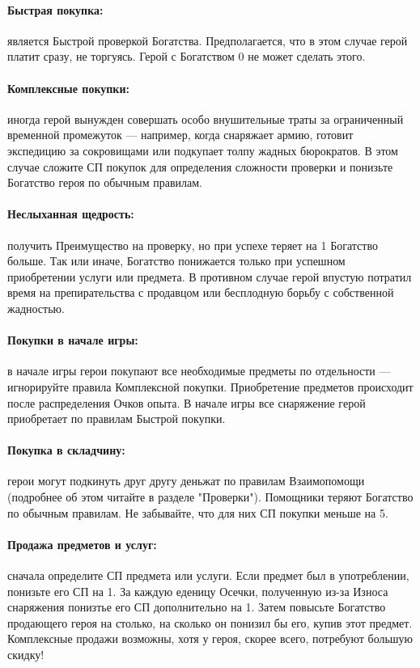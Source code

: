 \paragraph{Быстрая покупка:} является Быстрой проверкой Богатства. Предполагается, что в этом случае герой платит сразу, не торгуясь. Герой с Богатством 0 не может сделать этого.
\paragraph{Комплексные покупки:} иногда герой вынужден совершать особо внушительные траты за ограниченный временной промежуток — например, когда снаряжает армию, готовит экспедицию за сокровищами или подкупает толпу жадных бюрократов. В этом случае сложите СП покупок для определения сложности проверки и понизьте Богатство героя по обычным правилам.
\paragraph{Неслыханная щедрость:} получить Преимущество на проверку, но при успехе теряет на 1 Богатство больше. Так или иначе, Богатство понижается только при успешном приобретении услуги или предмета. В противном случае герой впустую потратил время на препирательства с продавцом или бесплодную борьбу с собственной жадностью.
\paragraph{Покупки в начале игры:} в начале игры герои покупают все необходимые предметы по отдельности — игнорируйте правила Комплексной покупки. Приобретение предметов происходит после распределения Очков опыта. В начале игры все снаряжение герой приобретает по правилам Быстрой покупки.
\paragraph{Покупка в складчину:} герои могут подкинуть друг другу деньжат по правилам Взаимопомощи (подробнее об этом читайте в разделе "Проверки"). Помощники теряют Богатство по обычным правилам. Не забывайте, что для них СП покупки меньше на 5.
\paragraph{Продажа предметов и услуг:} сначала определите СП предмета или услуги. Если предмет был в употреблении, понизьте его СП на 1. За каждую еденицу Осечки, полученную из-за Износа снаряжения понизтье его СП дополнительно на 1. Затем повысьте Богатство продающего героя на столько, на сколько он понизил бы его, купив этот предмет. Комплексные продажи возможны, хотя у героя, скорее всего, потребуют большую скидку!
